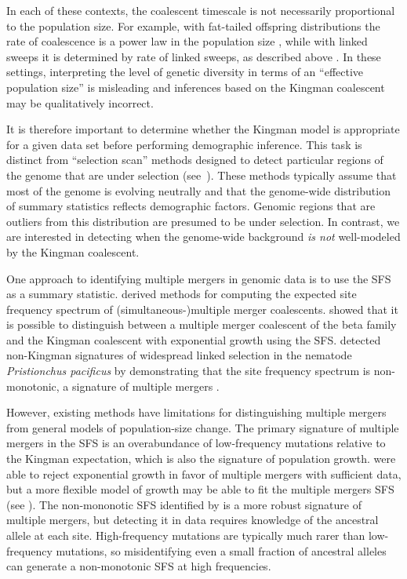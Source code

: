 \documentclass[11pt, letterpaper]{article}   	%
\begin{document}
In each of these contexts, the coalescent timescale is not necessarily proportional to the population size.
For example, with fat-tailed offspring distributions the rate of coalescence is a power law in the population size \autocite{Schweinsberg2003}, while with linked sweeps it is determined by rate of linked sweeps, as described above \autocite{DurrettSchweinsberg2005}.
In these settings, interpreting the level of genetic diversity in terms of an ``effective population size'' is misleading and inferences based on the Kingman coalescent may be qualitatively incorrect.

It is therefore important to determine whether the Kingman model is appropriate for a given data set before performing demographic inference.
This task is distinct from ``selection scan'' methods designed to detect particular regions of the genome that are under selection (see~\cite{VittiEtAl2013}).
These methods typically assume that most of the genome is evolving neutrally and that the genome-wide distribution of summary statistics reflects demographic factors.
Genomic regions that are outliers from this distribution are presumed to be under selection.
In contrast, we are interested in detecting when the genome-wide background \emph{is not} well-modeled by the Kingman coalescent.

One approach to identifying multiple mergers in genomic data is to use the SFS as a summary statistic.
\cite{BirknerEtAl2013, BlathEtAl2016, SpenceEtAl2016} derived methods for computing the expected site frequency spectrum of (simultaneous-)multiple merger coalescents.
\cite{EldonEtAl2015} showed that it is possible to distinguish between a multiple merger coalescent of the beta family and the Kingman coalescent with exponential growth using the SFS.
\cite{RodelspergerEtAl2014} detected non-Kingman signatures of widespread linked selection in the nematode \textit{Pristionchus pacificus} by demonstrating that the site frequency spectrum is non-monotonic, a signature of multiple mergers \autocite{NeherHallatscheck2013, BirknerEtAl2013}.

However, existing methods have limitations for distinguishing multiple mergers from general models of population-size change.
The primary signature of multiple mergers in the SFS is an overabundance of low-frequency mutations relative to the Kingman expectation, which is also the signature of population growth.
\cite{EldonEtAl2015} were able to reject exponential growth in favor of multiple mergers with sufficient data, but a more flexible model of growth may be able to fit the multiple mergers SFS (see \cite{MyersEtAl2008, BhaskarSong2014}).
The non-mononotic SFS identified by \cite{RodelspergerEtAl2014} is a more robust signature of multiple mergers, but detecting it in data requires knowledge of the ancestral allele at each site.
High-frequency mutations are typically much rarer than low-frequency mutations, so misidentifying even a small fraction of ancestral alleles can generate a non-monotonic SFS at high frequencies.
\end{document}
